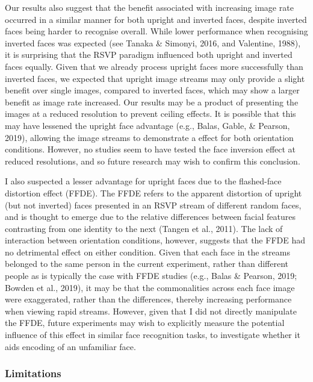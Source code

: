 \documentclass[
  english,
  man]{apa6}
\begin{document}
Our results also suggest that the benefit associated with increasing image rate occurred in a similar manner for both upright and inverted faces, despite inverted faces being harder to recognise overall. While lower performance when recognising inverted faces was expected (see Tanaka \& Simonyi, 2016, and Valentine, 1988), it is surprising that the RSVP paradigm influenced both upright and inverted faces equally. Given that we already process upright faces more successfully than inverted faces, we expected that upright image streams may only provide a slight benefit over single images, compared to inverted faces, which may show a larger benefit as image rate increased. Our results may be a product of presenting the images at a reduced resolution to prevent ceiling effects. It is possible that this may have lessened the upright face advantage (e.g., Balas, Gable, \& Pearson, 2019), allowing the image streams to demonstrate a effect for both orientation conditions. However, no studies seem to have tested the face inversion effect at reduced resolutions, and so future research may wish to confirm this conclusion.

I also suspected a lesser advantage for upright faces due to the flashed-face distortion effect (FFDE). The FFDE refers to the apparent distortion of upright (but not inverted) faces presented in an RSVP stream of different random faces, and is thought to emerge due to the relative differences between facial features contrasting from one identity to the next (Tangen et al., 2011). The lack of interaction between orientation conditions, however, suggests that the FFDE had no detrimental effect on either condition. Given that each face in the streams belonged to the same person in the current experiment, rather than different people as is typically the case with FFDE studies (e.g., Balas \& Pearson, 2019; Bowden et al., 2019), it may be that the commonalities across each face image were exaggerated, rather than the differences, thereby increasing performance when viewing rapid streams. However, given that I did not directly manipulate the FFDE, future experiments may wish to explicitly measure the potential influence of this effect in similar face recognition tasks, to investigate whether it aids encoding of an unfamiliar face.

\hypertarget{limitations}{%
\subsubsection{Limitations}\label{limitations}}
\end{document}
